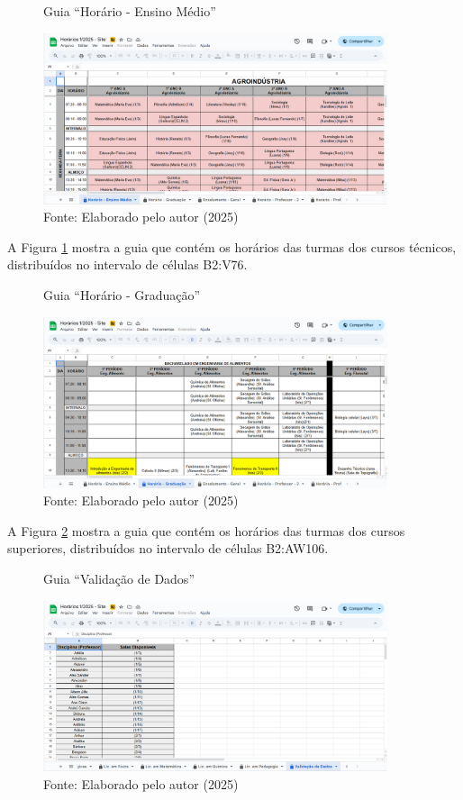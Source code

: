 \begin{figure}[H]
    \centering
    \caption{Guia ``Horário - Ensino Médio''}
    \includegraphics[width=0.9\textwidth]{Figuras/plan-1.png}
    \caption*{Fonte: Elaborado pelo autor (2025)}
    \label{fig_plan_1}
\end{figure}

A Figura \ref{fig_plan_1} mostra a guia que contém os horários das turmas dos cursos técnicos, distribuídos no intervalo de células B2:V76.

\begin{figure}[htb]
    \centering
    \caption{Guia ``Horário - Graduação''}
    \includegraphics[width=0.9\textwidth]{Figuras/plan-2.png}
    \caption*{Fonte: Elaborado pelo autor (2025)}
    \label{fig_plan_2}
\end{figure}

A Figura \ref{fig_plan_2} mostra a guia que contém os horários das turmas dos cursos superiores, distribuídos no intervalo de células B2:AW106.

\begin{figure}[H]
    \centering
    \caption{Guia ``Validação de Dados''}
    \includegraphics[width=0.9\textwidth]{Figuras/plan-3.png}
    \caption*{Fonte: Elaborado pelo autor (2025)}
    \label{fig_plan_3}
\end{figure}

